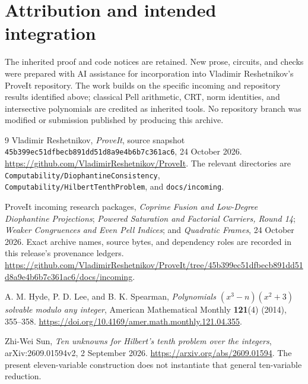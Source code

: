 \documentclass[11pt]{article}
\theoremstyle{definition}
\theoremstyle{remark}
\begin{document}
\section*{Attribution and intended integration}
The inherited proof and code notices are retained. New prose, circuits,
and checks were prepared with AI assistance for incorporation into
Vladimir Reshetnikov's ProveIt repository. The work builds on the
specific incoming and repository results identified above; classical
Pell arithmetic, CRT, norm identities, and intersective polynomials
are credited as inherited tools. No repository branch was modified
or submission published by producing this archive.

{\raggedright
\begin{thebibliography}{9}
Vladimir Reshetnikov, \emph{ProveIt}, source snapshot
\texttt{45b399ec51df}\allowbreak\texttt{becb891dd51d8a9e4b6b7c361ac6},
24 October 2026.
\url{https://github.com/VladimirReshetnikov/ProveIt}.
The relevant directories are \texttt{Computability/DiophantineConsistency},
\texttt{Computability/HilbertTenthProblem}, and \texttt{docs/incoming}.

ProveIt incoming research packages, \emph{Coprime Fusion and Low-Degree
Diophantine Projections}; \emph{Powered Saturation and Factorial
Carriers, Round 14}; \emph{Weaker Congruences and Even Pell Indices};
and \emph{Quadratic Frames}, 24 October 2026.
Exact archive names, source bytes, and dependency roles are recorded
in this release's provenance ledgers.
\url{https://github.com/VladimirReshetnikov/ProveIt/tree/45b399ec51dfbecb891dd51d8a9e4b6b7c361ac6/docs/incoming}.

A. M. Hyde, P. D. Lee, and B. K. Spearman,
\emph{Polynomials $(x^3-n)(x^2+3)$ solvable modulo any integer},
American Mathematical Monthly \textbf{121}(4) (2014), 355--358.
\url{https://doi.org/10.4169/amer.math.monthly.121.04.355}.

Zhi-Wei Sun, \emph{Ten unknowns for Hilbert's tenth problem over
the integers}, arXiv:2609.01594v2, 2 September 2026.
\url{https://arxiv.org/abs/2609.01594}.
The present eleven-variable construction does not instantiate that
general ten-variable reduction.
\end{thebibliography}
}
\end{document}
